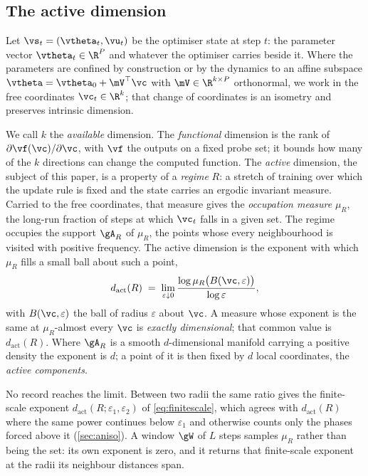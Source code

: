 \documentclass[twoside]{article}
\newenvironment{claude}{\color{claudecolor}}{}
\begin{document}
\begin{claude}
\subsection{The active dimension}\label{sec:three}
\end{claude}

Let $\vs_t = (\vtheta_t, \vu_t)$ be the optimiser state at step $t$: the parameter vector
$\vtheta_t \in \R^P$ and whatever the optimiser carries beside it. Where the parameters are
confined by construction
or by the dynamics to an affine subspace $\vtheta = \vtheta_0 + \mV^{\top}\vc$ with
$\mV \in \R^{k \times P}$ orthonormal, we work in the free coordinates $\vc_t \in \R^k$; that
change of coordinates is an isometry and preserves intrinsic dimension.

We call $k$ the \emph{available} dimension. The \emph{functional} dimension is the rank of
$\partial \vf(\vc)/\partial \vc$, with $\vf$ the outputs on a fixed probe set; it bounds how many of
the $k$ directions can change the computed function. The \emph{active} dimension, the subject of
this paper, is a property of a \emph{regime} $R$: a stretch of training over which the update rule
is fixed and the state carries an ergodic invariant measure. Carried to the free coordinates, that
measure gives the \emph{occupation measure} $\mu_R$, the long-run fraction of steps at which $\vc_t$
falls in a given set. The regime occupies the support $\gA_R$ of $\mu_R$, the points whose every
neighbourhood is visited with positive frequency. The active dimension is the exponent with which
$\mu_R$ fills a small ball about such a point,
\begin{equation}\label{eq:act}
  d_{\mathrm{act}}(R) \;=\; \lim_{\varepsilon \downarrow 0}
  \frac{\log \mu_R\bigl(B(\vc, \varepsilon)\bigr)}{\log \varepsilon} ,
\end{equation}
with $B(\vc, \varepsilon)$ the ball of radius $\varepsilon$ about $\vc$. A measure whose exponent
is the same at $\mu_R$-almost every $\vc$ is \emph{exactly dimensional}; that common value is
$d_{\mathrm{act}}(R)$. Where $\gA_R$ is a smooth $d$-dimensional manifold carrying a positive
density the exponent is $d$; a point of it is then fixed by $d$ local coordinates, the \emph{active
components}.

No record reaches the limit. Between two radii the same ratio gives the finite-scale exponent
$d_{\mathrm{act}}(R; \varepsilon_1, \varepsilon_2)$ of \cref{eq:finitescale}, which agrees with
$d_{\mathrm{act}}(R)$ where the same power continues below $\varepsilon_1$ and otherwise counts only
the phases forced above it (\cref{sec:aniso}). A window $\gW$ of $L$ steps samples $\mu_R$ rather
than being the set: its own exponent is zero, and it returns that finite-scale exponent at the
radii its neighbour distances span.
\end{document}
